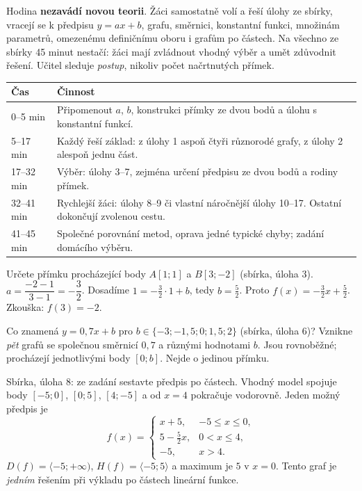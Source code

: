 \documentclass[11pt,a4paper]{article}
\begin{document}
Hodina \textbf{nezavádí novou teorii}. Žáci samostatně volí a řeší úlohy ze sbírky,
vracejí se k předpisu $y=ax+b$, grafu, směrnici, konstantní funkci, množinám parametrů,
omezenému definičnímu oboru i grafům po částech. Na všechno ze sbírky 45 minut nestačí:
žáci mají zvládnout vhodný výběr a umět zdůvodnit řešení. Učitel sleduje \emph{postup},
nikoliv počet načrtnutých přímek.
\begin{center}\small
\begin{tabularx}{\linewidth}{@{}p{20mm}X@{}}\toprule
Čas & Činnost\\\midrule
0--5 min & Připomenout $a$, $b$, konstrukci přímky ze dvou bodů a úlohu s konstantní funkcí.\\
5--17 min & Každý řeší základ: z úlohy 1 aspoň čtyři různorodé grafy, z úlohy 2 alespoň jednu část.\\
17--32 min & Výběr: úlohy 3--7, zejména určení předpisu ze dvou bodů a rodiny přímek.\\
32--41 min & Rychlejší žáci: úlohy 8--9 či vlastní náročnější úlohy 10--17. Ostatní dokončují zvolenou cestu.\\
41--45 min & Společné porovnání metod, oprava jedné typické chyby; zadání domácího výběru.\\\bottomrule
\end{tabularx}\end{center}
\begin{zadaniReseniBox}[title={Samostatná práce 1}]
Určete přímku procházející body $A[1;1]$ a $B[3;-2]$ (sbírka, úloha 3).
\tcblower
$a=\dfrac{-2-1}{3-1}=-\dfrac32$. Dosadíme $1=-\frac32\cdot1+b$, tedy $b=\frac52$.
Proto $f(x)=-\frac32x+\frac52$. Zkouška: $f(3)=-2$.
\end{zadaniReseniBox}
\begin{zadaniReseniBox}[title={Samostatná práce 2}]
Co znamená $y=0{,}7x+b$ pro $b\in\{-3;-1{,}5;0;1{,}5;2\}$ (sbírka, úloha 6)?
\tcblower
Vznikne \emph{pět} grafů se společnou směrnicí $0{,}7$ a různými hodnotami $b$.
Jsou rovnoběžné; procházejí jednotlivými body $[0;b]$. Nejde o jedinou přímku.
\end{zadaniReseniBox}
\begin{zadaniReseniBox}[title={Samostatná práce 3}]
Sbírka, úloha 8: ze zadání sestavte předpis po částech.
\tcblower
Vhodný model spojuje body $[-5;0]$, $[0;5]$, $[4;-5]$
a od $x=4$ pokračuje vodorovně. Jeden možný předpis je
\[
 f(x)=\begin{cases}
 x+5,&-5\le x\le0,\\
 5-\tfrac52x,&0<x\le4,\\
 -5,&x>4.
 \end{cases}
\]
$D(f)=\langle-5;+\infty)$, $H(f)=\langle-5;5\rangle$ a maximum je $5$ v $x=0$.
Tento graf je \emph{jedním} řešením při výkladu po částech lineární funkce.
\end{zadaniReseniBox}
\end{document}

